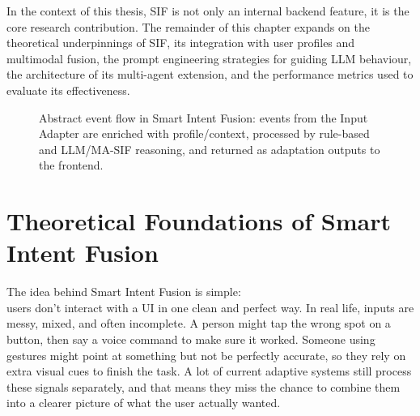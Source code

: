 \documentclass[openany]{book}
\begin{document}
In the context of this thesis, SIF is not only an internal backend feature, it is the core research contribution.
The remainder of this chapter expands on the theoretical underpinnings of SIF, its integration with user profiles and multimodal fusion, the prompt engineering strategies for guiding LLM behaviour, the architecture of its multi-agent extension, and the performance metrics used to evaluate its effectiveness.
\begin{figure}[h]
\centering
{}
\caption{Abstract event flow in Smart Intent Fusion: events from the Input Adapter are enriched with profile/context, processed by rule-based and LLM/MA-SIF reasoning, and returned as adaptation outputs to the frontend.}
\label{fig:sif-event-flow}
\end{figure}

\section{Theoretical Foundations of Smart Intent Fusion}
The idea behind Smart Intent Fusion is simple:
\\ users don’t interact with a UI in one clean and perfect way. In real life, inputs are messy, mixed, and often incomplete. A person might tap the wrong spot on a button, then say a voice command to make sure it worked. Someone using gestures might point at something but not be perfectly accurate, so they rely on extra visual cues to finish the task. A lot of current adaptive systems still process these signals separately, and that means they miss the chance to combine them into a clearer picture of what the user actually wanted.
\end{document}
